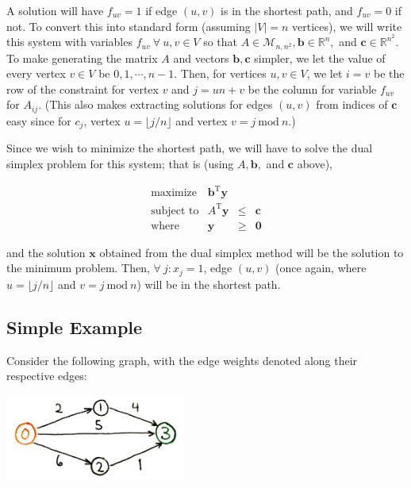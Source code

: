A solution will have $f_{uv} = 1$ if edge $(u,v)$ is in the shortest path, and $f_{uv} = 0$ if not. To convert this into standard form (assuming $|V| = n$ vertices), we will write this system with variables $f_{uv}\ \forall\ u,v \in V$ so that $A \in \mathcal{M}_{n,n^2}, \mathbf{b} \in \mathbb{R}^n,$ and $\mathbf{c} \in \mathbb{R}^{n^2}$. To make generating the matrix $A$ and vectors $\mathbf{b}, \mathbf{c}$ simpler, we let the value of every vertex $v \in V$ be $0, 1, \cdots, n-1$. Then, for vertices $u,v \in V$, we let $i = v$ be the row of the constraint for vertex $v$ and $j = un + v$ be the column for variable $f_{uv}$ for $A_{ij}$. (This also makes extracting solutions for edges $(u,v)$ from indices of $\mathbf{c}$ easy since for $c_j$, vertex $u = \lfloor j / n \rfloor$ and vertex $v = j\ \text{mod}\ n$.)

Since we wish to minimize the shortest path, we will have to solve the dual simplex problem for this system; that is (using $A, \mathbf{b},$ and $\mathbf{c}$ above),

\begin{equation} %
    \begin{array}{rrcl}
        \text{maximize} & \mathbf{b}^\text{T} \mathbf{y} \\
        \text{subject\ to} & A^\text{T} \mathbf{y} & \leq & \mathbf{c} \\
        \text{where} & \mathbf{y} & \geq & \mathbf{0}
    \end{array}
\end{equation}

and the solution $\mathbf{x}$ obtained from the dual simplex method will be the solution to the minimum problem. Then, $\forall\ j: x_j = 1$, edge $(u,v)$ (once again, where $u = \lfloor j / n \rfloor$ and $v = j\ \text{mod}\ n$) will be in the shortest path.

\subsection{Simple Example}

Consider the following graph, with the edge weights denoted along their respective edges:

\begin{center}
    \includegraphics[width=2.33in]{simple}
\end{center}

